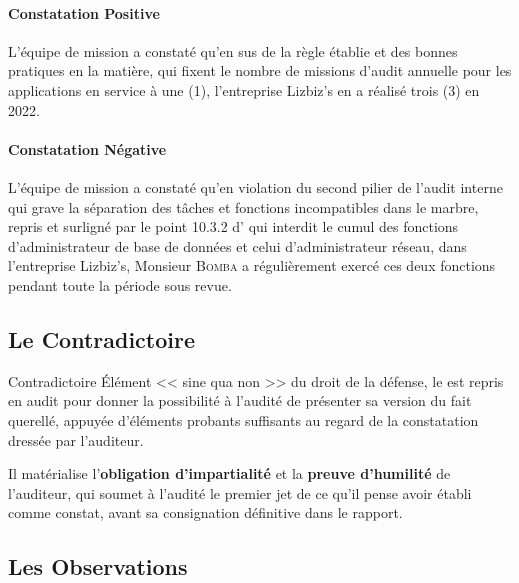 \paragraph{Constatation Positive}
L'équipe de mission a constaté qu'en sus de la règle établie et des bonnes pratiques
en la matière, qui fixent le nombre de missions d'audit annuelle pour les applications
en service à une (1), l'entreprise Lizbiz's en a réalisé trois (3) en 2022.

\paragraph{Constatation Négative}
L'équipe de mission a constaté qu'en violation du second pilier de l'audit interne qui
grave la séparation des tâches et fonctions incompatibles dans le marbre, repris et
surligné par le point 10.3.2 d' qui interdit le cumul des fonctions
d'administrateur de base de données et celui d'administrateur réseau, dans l'entreprise
Lizbiz's, Monsieur \textsc{Bomba} a régulièrement exercé ces deux fonctions pendant
toute la période sous revue.

\subsection{Le Contradictoire}

\begin{boxdef}{Contradictoire}
Élément << sine qua non >> du droit de la défense, le 
est repris en audit pour donner la possibilité à l'audité de présenter sa version du
fait querellé, appuyée d'éléments probants suffisants au regard de la constatation
dressée par l'auditeur.

Il matérialise l'\textbf{obligation d'impartialité} et la \textbf{preuve d'humilité}
de l'auditeur, qui soumet à l'audité le premier jet de ce qu'il pense avoir établi comme
constat, avant sa consignation définitive dans le rapport.
\end{boxdef}

\subsection{Les Observations}

